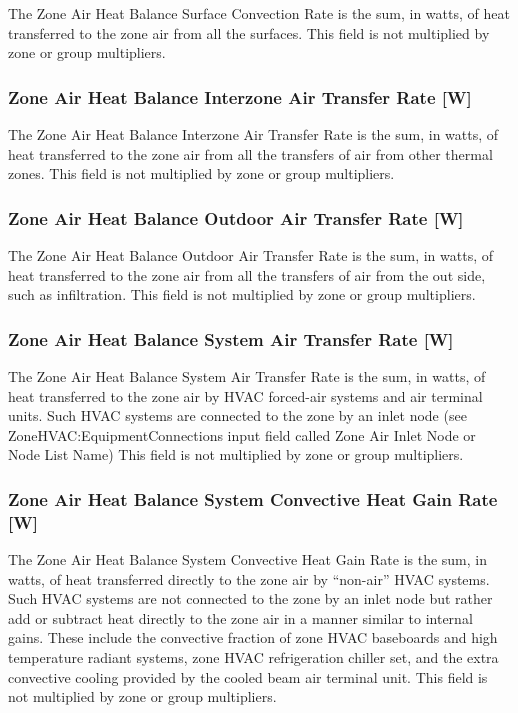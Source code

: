 The Zone Air Heat Balance Surface Convection Rate is the sum, in watts, of heat transferred to the zone air from all the surfaces. This field is not multiplied by zone or group multipliers.

\subsubsection{Zone Air Heat Balance Interzone Air Transfer Rate {[}W{]}}\label{zone-air-heat-balance-interzone-air-transfer-rate-w}

The Zone Air Heat Balance Interzone Air Transfer Rate is the sum, in watts, of heat transferred to the zone air from all the transfers of air from other thermal zones. This field is not multiplied by zone or group multipliers.

\subsubsection{Zone Air Heat Balance Outdoor Air Transfer Rate {[}W{]}}\label{zone-air-heat-balance-outdoor-air-transfer-rate-w}

The Zone Air Heat Balance Outdoor Air Transfer Rate is the sum, in watts, of heat transferred to the zone air from all the transfers of air from the out side, such as infiltration. This field is not multiplied by zone or group multipliers.

\subsubsection{Zone Air Heat Balance System Air Transfer Rate {[}W{]}}\label{zone-air-heat-balance-system-air-transfer-rate-w}

The Zone Air Heat Balance System Air Transfer Rate is the sum, in watts, of heat transferred to the zone air by HVAC forced-air systems and air terminal units. Such HVAC systems are connected to the zone by an inlet node (see ZoneHVAC:EquipmentConnections input field called Zone Air Inlet Node or Node List Name) This field is not multiplied by zone or group multipliers.

\subsubsection{Zone Air Heat Balance System Convective Heat Gain Rate {[}W{]}}\label{zone-air-heat-balance-system-convective-heat-gain-rate-w}

The Zone Air Heat Balance System Convective Heat Gain Rate is the sum, in watts, of heat transferred directly to the zone air by ``non-air'' HVAC systems. Such HVAC systems are not connected to the zone by an inlet node but rather add or subtract heat directly to the zone air in a manner similar to internal gains. These include the convective fraction of zone HVAC baseboards and high temperature radiant systems, zone HVAC refrigeration chiller set, and the extra convective cooling provided by the cooled beam air terminal unit. This field is not multiplied by zone or group multipliers.

